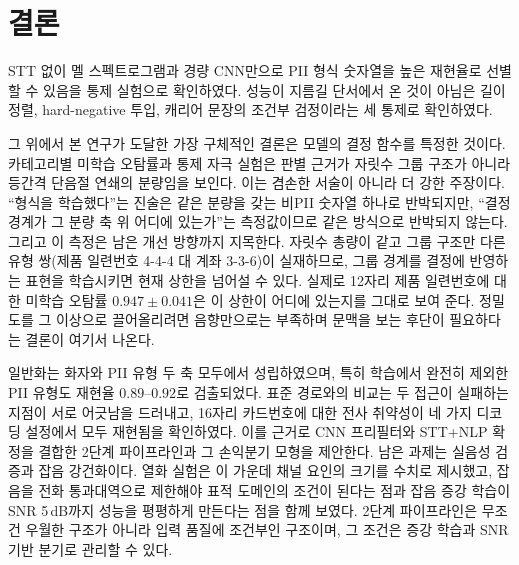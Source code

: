 \documentclass[11pt]{article}
\begin{document}
\section{결론}\label{sec:conclusion}
STT 없이 멜 스펙트로그램과 경량 CNN만으로 PII 형식 숫자열을 높은 재현율로 선별할 수 있음을
통제 실험으로 확인하였다. 성능이 지름길 단서에서 온 것이 아님은 길이 정렬, hard-negative
투입, 캐리어 문장의 조건부 검정이라는 세 통제로 확인하였다.

그 위에서 본 연구가 도달한 가장 구체적인 결론은 모델의 결정 함수를 특정한 것이다. 카테고리별
미학습 오탐률과 통제 자극 실험은 판별 근거가 자릿수 그룹 구조가 아니라 등간격 단음절 연쇄의
분량임을 보인다. 이는 겸손한 서술이 아니라 더 강한 주장이다. ``형식을 학습했다''는 진술은
같은 분량을 갖는 비PII 숫자열 하나로 반박되지만, ``결정 경계가 그 분량 축 위 어디에 있는가''는
측정값이므로 같은 방식으로 반박되지 않는다. 그리고 이 측정은 남은 개선 방향까지 지목한다.
자릿수 총량이 같고 그룹 구조만 다른 유형 쌍(제품 일련번호 4-4-4 대 계좌 3-3-6)이 실재하므로,
그룹 경계를 결정에 반영하는 표현을 학습시키면 현재 상한을 넘어설 수 있다. 실제로 12자리 제품 일련번호에 대한 미학습 오탐률
$0.947\pm0.041$은 이 상한이 어디에 있는지를 그대로 보여 준다. 정밀도를 그 이상으로 끌어올리려면
음향만으로는 부족하며 문맥을 보는 후단이 필요하다는 결론이 여기서 나온다.

일반화는 화자와 PII 유형 두 축 모두에서 성립하였으며, 특히 학습에서 완전히 제외한 PII
유형도 재현율 $0.89$--$0.92$로 검출되었다. 표준 경로와의 비교는 두 접근이 실패하는 지점이
서로 어긋남을 드러내고, 16자리 카드번호에 대한 전사 취약성이 네 가지 디코딩 설정에서 모두
재현됨을 확인하였다. 이를 근거로 CNN 프리필터와 STT+NLP 확정을 결합한 2단계 파이프라인과
그 손익분기 모형을 제안한다. 남은 과제는 실음성 검증과 잡음 강건화이다. 열화 실험은 이
가운데 채널 요인의 크기를 수치로 제시했고, 잡음을 전화 통과대역으로 제한해야 표적 도메인의
조건이 된다는 점과 잡음 증강 학습이 SNR 5\,dB까지 성능을 평평하게 만든다는 점을 함께 보였다.
2단계 파이프라인은 무조건 우월한 구조가 아니라 입력 품질에 조건부인 구조이며, 그 조건은
증강 학습과 SNR 기반 분기로 관리할 수 있다.

\FloatBarrier


\end{document}
